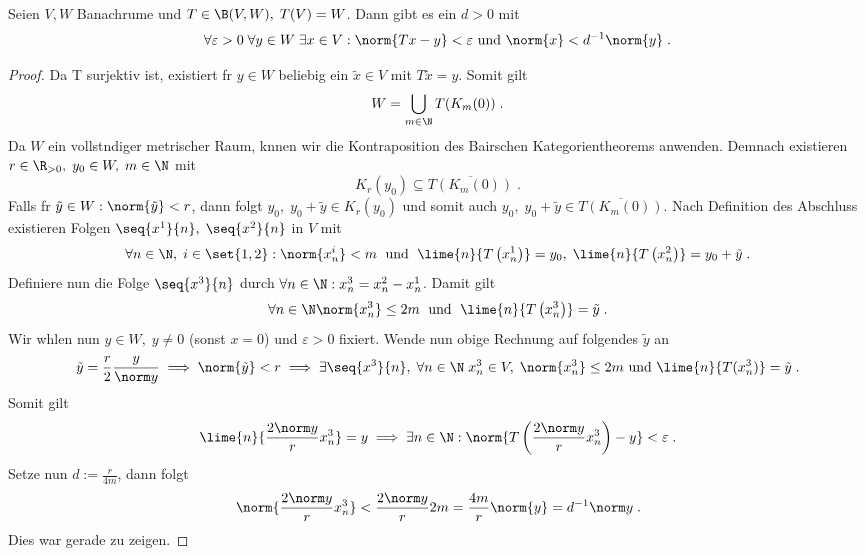 \begin{lemma}
	Seien \(V,W\) Banachr\as ume und \(T\in \B(V,W),\;T(V) = W\). Dann gibt es ein \(d> 0\) mit 
	\[\forall \varepsilon > 0 \;\forall y\in W \;\exists x \in V: \norm{Tx-y} < \varepsilon \text{ und } \norm{x} < d^{-1}\norm{y}\;.\]
	\label{lemma1_Offene_Abb}
\end{lemma}
\begin{proof}
	Da T surjektiv ist, existiert f\us r \(y\in W\) beliebig ein \(\tilde x \in V\) mit \(T\tilde x = y\). Somit gilt
	\[W = \bigcup_{m\in \N} T(K_m(0))\;.\] 
	Da $W$ ein vollst\as ndiger metrischer Raum, k\os nnen wir die Kontraposition des Bairschen Kategorientheorems anwenden. Demnach existieren \(r\in \R_{>0},\;y_0 \in  W,\; m\in\N\) mit 
	\[K_r(y_0) \subseteq \overline{T(K_m(0))}\;.\]
	Falls f\us r \(\tilde y \in W: \norm{\tilde y}<r\), dann folgt \(y_0,\;y_0 + \tilde y \in K_r(y_0)\) und somit auch \(y_0,\;y_0 + \tilde y \in \overline{T(K_m(0))}\). Nach Definition des Abschluss existieren Folgen \(\seq{x^1}{n}, \;\seq{x^2}{n}\) in $V$ mit
	\[\forall n\in \N, \;i\in\set{1,2}: \norm{x^i_n}< m \;\text{ und }\; \lime{n}{T\left(x^1_n\right)} = y_0,\; \lime{n}{T\left(x^2_n\right)} = y_0 + \tilde y\;.\]
	Definiere nun die Folge \(\seq{x^3}{n}\) durch \(\forall n \in \N: x^3_n = x^2_n - x^1_n\). Damit gilt
	\[\forall n \in \N \norm{x^3_n} \leq 2m \;\text{ und }\; \lime{n}{T\left(x^3_n\right)} = \tilde y\;.\]
	Wir w\as hlen nun \(y\in W,\; y \neq 0\) (sonst \(x=0\)) und \(\varepsilon > 0\) fixiert. Wende nun obige Rechnung auf folgendes \(\tilde y\) an
	\[\tilde y = \frac{r}{2} \frac{y}{\norm y} \implies \norm{\tilde y} < r \implies \exists \seq{x^3}{n},\;\forall n\in \N\; x^3_n\in V,\; \norm{x^3_n} \leq 2m \text{ und }\lime{n}{T(x^3_n)} = \tilde y\;.\]
	Somit gilt 
	\[\lime{n}{\frac{2\norm y}{r} x^3_n} = y \implies \exists n\in \N: \norm{T\left(\frac{2\norm y}{r} x^3_n\right)-y}< \varepsilon\;.\]
	Setze nun \(d:=\frac{r}{4m}\), dann folgt
	\[\norm{\frac{2\norm y}{r} x^3_n} < \frac{2\norm y}{r} 2m = \frac{4m}r \norm{y} = d^{-1} \norm y\;.\]
	Dies war gerade zu zeigen.
\end{proof}

